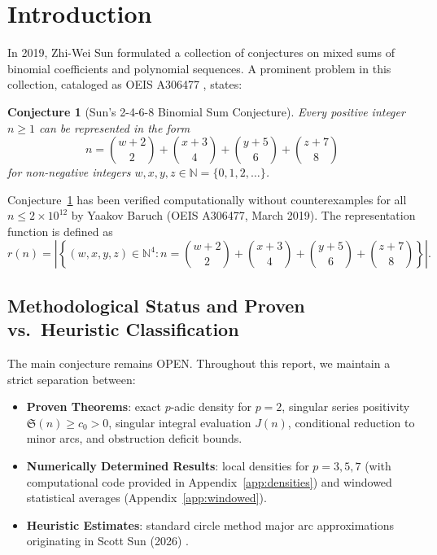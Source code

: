 \documentclass[11pt, a4paper]{article}
\theoremstyle{plain}
\newtheorem{conjecture}[theorem]{Conjecture}
\theoremstyle{definition}
\begin{document}
\section{Introduction}

In 2019, Zhi-Wei Sun \cite{oeisA306477, sun2019conjectures} formulated a collection of conjectures on mixed sums of binomial coefficients and polynomial sequences. A prominent problem in this collection, cataloged as OEIS A306477 \cite{oeisA306477}, states:

\begin{conjecture}[Sun's 2-4-6-8 Binomial Sum Conjecture]\label{conj:sun}
Every positive integer $n \geq 1$ can be represented in the form
\begin{equation}\label{eq:conjecture_rep}
n = \binom{w+2}{2} + \binom{x+3}{4} + \binom{y+5}{6} + \binom{z+7}{8}
\end{equation}
for non-negative integers $w,x,y,z \in \mathbb{N} = \{0,1,2,\ldots\}$.
\end{conjecture}

Conjecture~\ref{conj:sun} has been verified computationally without counterexamples for all $n \leq 2 \times 10^{12}$ by Yaakov Baruch (OEIS A306477, March 2019). The representation function is defined as
\begin{equation}
r(n) = \left|\left\{(w,x,y,z) \in \mathbb{N}^4 : n = \binom{w+2}{2} + \binom{x+3}{4} + \binom{y+5}{6} + \binom{z+7}{8}\right\}\right|.
\end{equation}

\subsection{Methodological Status and Proven vs.\ Heuristic Classification}
The main conjecture remains OPEN. Throughout this report, we maintain a strict separation between:
\begin{itemize}
\item \textbf{Proven Theorems}: exact $p$-adic density for $p=2$, singular series positivity $\mathfrak{S}(n) \geq c_0 > 0$, singular integral evaluation $J(n)$, conditional reduction to minor arcs, and obstruction deficit bounds.
\item \textbf{Numerically Determined Results}: local densities for $p=3,5,7$ (with computational code provided in Appendix~\ref{app:densities}) and windowed statistical averages (Appendix~\ref{app:windowed}).
\item \textbf{Heuristic Estimates}: standard circle method major arc approximations originating in Scott Sun (2026) \cite{scottsun2026v2}.
\end{itemize}
\end{document}
